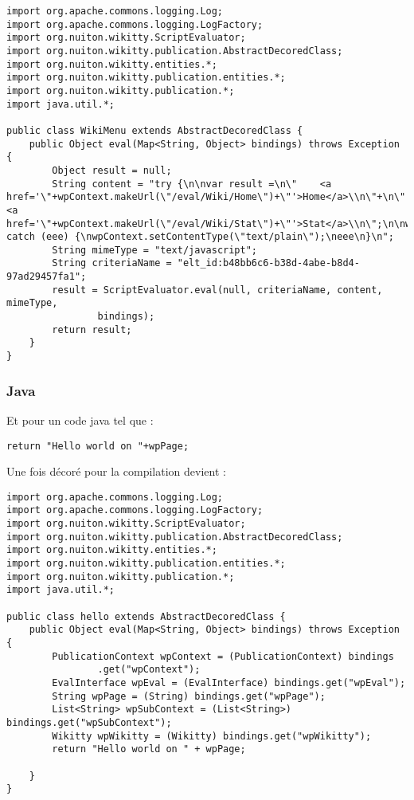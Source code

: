 \begin{lstlisting}
import org.apache.commons.logging.Log;
import org.apache.commons.logging.LogFactory;
import org.nuiton.wikitty.ScriptEvaluator;
import org.nuiton.wikitty.publication.AbstractDecoredClass;
import org.nuiton.wikitty.entities.*;
import org.nuiton.wikitty.publication.entities.*;
import org.nuiton.wikitty.publication.*;
import java.util.*;

public class WikiMenu extends AbstractDecoredClass {
    public Object eval(Map<String, Object> bindings) throws Exception {
        Object result = null;
        String content = "try {\n\nvar result =\n\"    <a href='\"+wpContext.makeUrl(\"/eval/Wiki/Home\")+\"'>Home</a>\\n\"+\n\"    <a href='\"+wpContext.makeUrl(\"/eval/Wiki/Stat\")+\"'>Stat</a>\\n\";\n\nwpContext.setContentType(\"text/html\");\nresult;\n} catch (eee) {\nwpContext.setContentType(\"text/plain\");\neee\n}\n";
        String mimeType = "text/javascript";
        String criteriaName = "elt_id:b48bb6c6-b38d-4abe-b8d4-97ad29457fa1";
        result = ScriptEvaluator.eval(null, criteriaName, content, mimeType,
                bindings);
        return result;
    }
}
\end{lstlisting}


\subsubsection*{Java}

Et pour un code java tel que :

\begin{lstlisting}
return "Hello world on "+wpPage;
\end{lstlisting}

Une fois décoré pour la compilation devient :

\begin{lstlisting}
import org.apache.commons.logging.Log;
import org.apache.commons.logging.LogFactory;
import org.nuiton.wikitty.ScriptEvaluator;
import org.nuiton.wikitty.publication.AbstractDecoredClass;
import org.nuiton.wikitty.entities.*;
import org.nuiton.wikitty.publication.entities.*;
import org.nuiton.wikitty.publication.*;
import java.util.*;

public class hello extends AbstractDecoredClass {
    public Object eval(Map<String, Object> bindings) throws Exception {
        PublicationContext wpContext = (PublicationContext) bindings
                .get("wpContext");
        EvalInterface wpEval = (EvalInterface) bindings.get("wpEval");
        String wpPage = (String) bindings.get("wpPage");
        List<String> wpSubContext = (List<String>) bindings.get("wpSubContext");
        Wikitty wpWikitty = (Wikitty) bindings.get("wpWikitty");
        return "Hello world on " + wpPage;

    }
}
\end{lstlisting}

